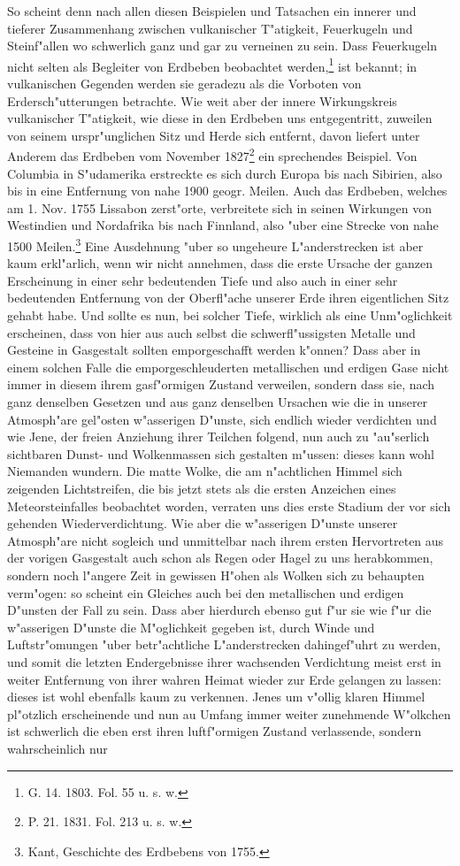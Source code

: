 \documentclass[a4paper, 8pt, oneside, polutonikogreek, german]{article}
\begin{document}
So scheint denn nach allen diesen Beispielen und Tatsachen ein innerer und tieferer Zusammenhang zwischen vulkanischer T"atigkeit, Feuerkugeln und Steinf"allen wo schwerlich ganz und gar zu verneinen zu sein. Dass Feuerkugeln nicht selten als Begleiter von Erdbeben beobachtet werden,\footnote{G. 14. 1803. Fol. 55 u. s. w.} ist bekannt; in vulkanischen Gegenden werden sie geradezu als die Vorboten von Erdersch"utterungen betrachte. Wie weit aber der innere Wirkungskreis vulkanischer T"atigkeit, wie diese in den Erdbeben uns entgegentritt, zuweilen von seinem urspr"unglichen Sitz und Herde sich entfernt, davon liefert unter Anderem das Erdbeben vom November 1827\footnote{P. 21. 1831. Fol. 213 u. s. w.} ein sprechendes Beispiel. Von Columbia in S"udamerika erstreckte es sich durch Europa bis nach Sibirien, also bis in eine Entfernung von nahe 1900 geogr. Meilen. Auch das Erdbeben, welches am 1. Nov. 1755 Lissabon zerst"orte, verbreitete sich in seinen Wirkungen von Westindien und Nordafrika bis nach Finnland, also "uber eine Strecke von nahe 1500 Meilen.\footnote{Kant, Geschichte des Erdbebens von 1755.} Eine Ausdehnung "uber so ungeheure L"anderstrecken ist aber kaum erkl"arlich, wenn wir nicht annehmen, dass die erste Ursache der ganzen Erscheinung in einer sehr bedeutenden Tiefe und also auch in einer sehr bedeutenden Entfernung von der Oberfl"ache unserer Erde ihren eigentlichen Sitz gehabt habe. Und sollte es nun, bei solcher Tiefe, wirklich als eine Unm"oglichkeit erscheinen, dass von hier aus auch selbst die schwerfl"ussigsten Metalle und Gesteine in Gasgestalt sollten emporgeschafft werden k"onnen? Dass aber in einem solchen Falle die emporgeschleuderten metallischen und erdigen Gase nicht immer in diesem ihrem gasf"ormigen Zustand verweilen, sondern dass sie, nach ganz denselben Gesetzen und aus ganz denselben Ursachen wie die in unserer Atmosph"are gel"osten w"asserigen D"unste, sich endlich wieder verdichten und wie Jene, der freien Anziehung ihrer Teilchen folgend, nun auch zu "au"serlich sichtbaren Dunst- und Wolkenmassen sich gestalten m"ussen: dieses kann wohl Niemanden wundern. Die matte Wolke, die am n"achtlichen Himmel sich zeigenden Lichtstreifen, die bis jetzt stets als die ersten Anzeichen eines Meteorsteinfalles beobachtet worden, verraten uns dies erste Stadium der vor sich gehenden Wiederverdichtung. Wie aber die w"asserigen D"unste unserer Atmosph"are nicht sogleich und unmittelbar nach ihrem ersten Hervortreten aus der vorigen Gasgestalt auch schon als Regen oder Hagel zu uns herabkommen, sondern noch l"angere Zeit in gewissen H"ohen als Wolken sich zu behaupten verm"ogen: so scheint ein Gleiches auch bei den metallischen und erdigen D"unsten der Fall zu sein. Dass aber hierdurch ebenso gut f"ur sie wie f"ur die w"asserigen D"unste die M"oglichkeit gegeben ist, durch Winde und Luftstr"omungen "uber betr"achtliche L"anderstrecken dahingef"uhrt zu werden, und somit die letzten Endergebnisse ihrer wachsenden Verdichtung meist erst in weiter Entfernung von ihrer wahren Heimat wieder zur Erde gelangen zu lassen: dieses ist wohl ebenfalls kaum zu verkennen. Jenes um v"ollig klaren Himmel pl"otzlich erscheinende und nun au Umfang immer weiter zunehmende W"olkchen ist schwerlich die eben erst ihren luftf"ormigen Zustand verlassende, sondern wahrscheinlich nur 
\end{document}

